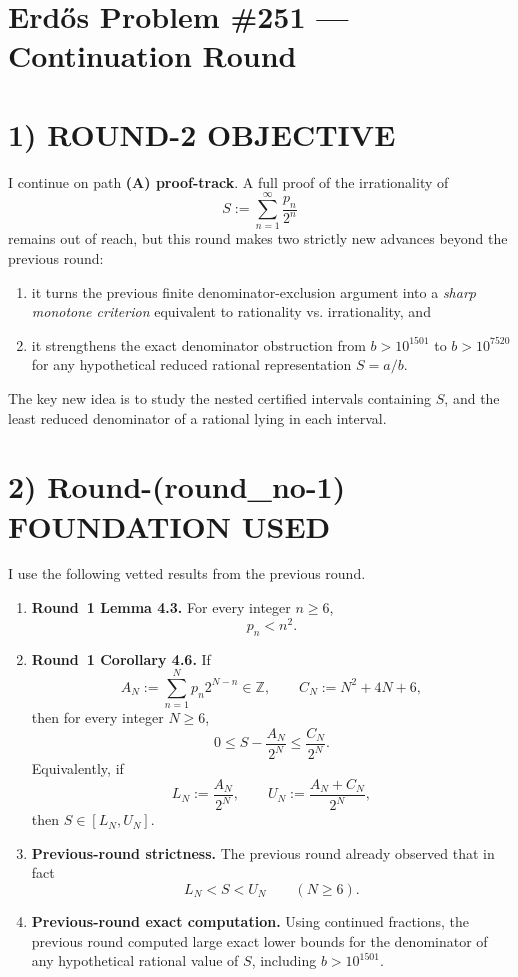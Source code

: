 \section*{Erd\H{o}s Problem \#251 --- Continuation Round}

\section*{1) ROUND-2 OBJECTIVE}

I continue on path \textbf{(A) proof-track}. A full proof of the irrationality of
\[
S:=\sum_{n=1}^{\infty}\frac{p_n}{2^n}
\]
remains out of reach, but this round makes two strictly new advances beyond the previous round:
\begin{enumerate}
\item it turns the previous finite denominator-exclusion argument into a \emph{sharp monotone criterion} equivalent to rationality vs. irrationality, and
\item it strengthens the exact denominator obstruction from
\(b>10^{1501}\) to \(b>10^{7520}\) for any hypothetical reduced rational representation \(S=a/b\).
\end{enumerate}

The key new idea is to study the nested certified intervals containing \(S\), and the least reduced denominator of a rational lying in each interval.

\section*{2) Round-(round\_no-1) FOUNDATION USED}

I use the following vetted results from the previous round.

\begin{enumerate}
\item \textbf{Round~1 Lemma 4.3.} For every integer \(n\ge 6\),
\[
p_n<n^2.
\]

\item \textbf{Round~1 Corollary 4.6.} If
\[
A_N:=\sum_{n=1}^N p_n2^{N-n}\in\mathbb Z,
\qquad
C_N:=N^2+4N+6,
\]
then for every integer \(N\ge 6\),
\[
0\le S-\frac{A_N}{2^N}\le \frac{C_N}{2^N}.
\]
Equivalently, if
\[
L_N:=\frac{A_N}{2^N},
\qquad
U_N:=\frac{A_N+C_N}{2^N},
\]
then \(S\in [L_N,U_N]\).

\item \textbf{Previous-round strictness.} The previous round already observed that in fact
\[
L_N<S<U_N \qquad (N\ge 6).
\]

\item \textbf{Previous-round exact computation.} Using continued fractions, the previous round computed large exact lower bounds for the denominator of any hypothetical rational value of \(S\), including \(b>10^{1501}\).
\end{enumerate}

